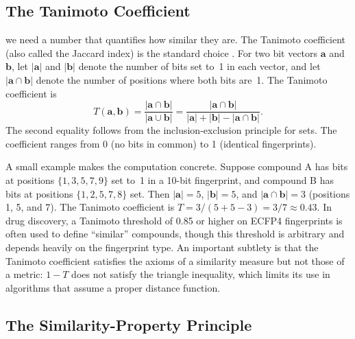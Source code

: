 \subsection{The Tanimoto Coefficient}
\label{sec:tanimoto}

 we need a number that quantifies how similar they are. The Tanimoto coefficient (also called the Jaccard index) is the standard choice \cite{willett1998}. For two bit vectors $\mathbf{a}$ and $\mathbf{b}$, let $|\mathbf{a}|$ and $|\mathbf{b}|$ denote the number of bits set to~1 in each vector, and let $|\mathbf{a} \cap \mathbf{b}|$ denote the number of positions where both bits are~1. The Tanimoto coefficient is
\begin{equation}
  \label{eq:tanimoto}
  T(\mathbf{a}, \mathbf{b}) = \frac{|\mathbf{a} \cap \mathbf{b}|}{|\mathbf{a} \cup \mathbf{b}|} = \frac{|\mathbf{a} \cap \mathbf{b}|}{|\mathbf{a}| + |\mathbf{b}| - |\mathbf{a} \cap \mathbf{b}|}.
\end{equation}
The second equality follows from the inclusion-exclusion principle for sets. The coefficient ranges from 0 (no bits in common) to 1 (identical fingerprints).

A small example makes the computation concrete. Suppose compound A has bits at positions $\{1, 3, 5, 7, 9\}$ set to~1 in a 10-bit fingerprint, and compound B has bits at positions $\{1, 2, 5, 7, 8\}$ set. Then $|\mathbf{a}| = 5$, $|\mathbf{b}| = 5$, and $|\mathbf{a} \cap \mathbf{b}| = 3$ (positions 1, 5, and 7). The Tanimoto coefficient is $T = 3 / (5 + 5 - 3) = 3/7 \approx 0.43$. In drug discovery, a Tanimoto threshold of 0.85 or higher on ECFP4 fingerprints is often used to define ``similar'' compounds, though this threshold is arbitrary and depends heavily on the fingerprint type. An important subtlety is that the Tanimoto coefficient satisfies the axioms of a similarity measure but not those of a metric: $1 - T$ does not satisfy the triangle inequality, which limits its use in algorithms that assume a proper distance function.


\subsection{The Similarity-Property Principle}
\label{sec:similarity-property}

